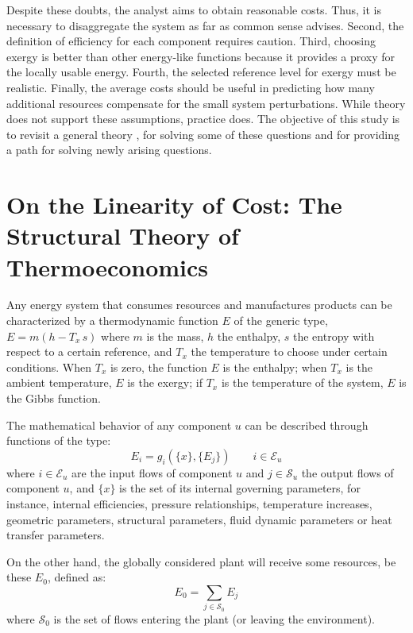 \documentclass[energies,article,submit,moreauthors,pdftex]{Definitions/mdpi}
\begin{document}
Despite these doubts, the analyst aims to obtain reasonable costs. Thus, it is necessary to disaggregate the system as far as common sense advises. Second, the definition of efficiency for each component requires caution. Third, choosing exergy is better than other energy-like functions because it provides a proxy for the locally usable energy. Fourth, the selected reference level for exergy must be realistic. Finally, the average costs should be useful in predicting how many additional resources compensate for the small system perturbations. While theory does not support these assumptions, practice does. The objective of this study is to revisit a general theory \cite{Valero1992a,Valero1992b}, for solving some of these questions and for providing a path for solving newly arising questions. 

\section{On the Linearity of Cost: The Structural Theory of Thermoeconomics}
Any energy system that consumes resources and manufactures products can be characterized by a thermodynamic function $E$ of the generic type, $E = m (h-T_x\,s)$ where $m$ is the mass, $h$ the enthalpy, $s$ the entropy with respect to a certain reference, and $T_x$ the temperature to choose under certain conditions. When $T_x$ is zero, the function $E$ is the enthalpy; when $T_x$ is the ambient temperature, $E$ is the exergy; if $T_x$ is the temperature of the system, $E$ is the Gibbs function.

The mathematical behavior of any component $u$ can be described through functions of the type:
\begin{equation}
    \label{eq:gcf}
    E_i=g_i\left(\{x\},\{E_j\}\right) \qquad i\in\mathcal{E}_u
\end{equation}
where $i\in\mathcal{E}_u$ are the input flows of component $u$ and $j\in\mathcal{S}_u$ the output flows of component $u$, and $\{x\}$ is the set of its internal governing parameters, for instance, internal efficiencies, pressure relationships, temperature increases, geometric parameters, structural parameters, fluid dynamic parameters or heat transfer parameters.

On the other hand, the globally considered plant will receive some resources, be these $E_0$, defined as:
\begin{equation}
E_0=\sum_{j\in\mathcal{S}_0}{E_j}
\end{equation}
where $\mathcal{S}_0$ is the set of flows entering the plant (or leaving the environment).
\end{document}
